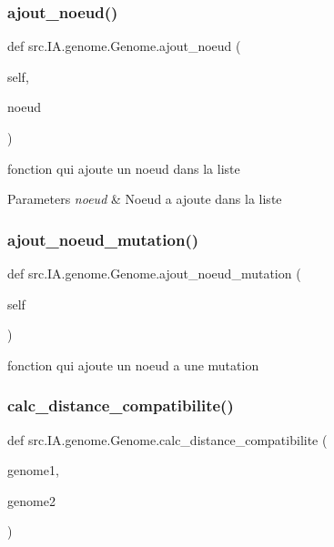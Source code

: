 \subsubsection{\texorpdfstring{ajout\+\_\+noeud()}{ajout\_noeud()}}
{\footnotesize\ttfamily def src.\+I\+A.\+genome.\+Genome.\+ajout\+\_\+noeud (\begin{DoxyParamCaption}\item[{}]{self,  }\item[{}]{noeud }\end{DoxyParamCaption})}



fonction qui ajoute un noeud dans la liste 


\begin{DoxyParams}{Parameters}
{\em noeud} & Noeud a ajoute dans la liste \\
\hline
\end{DoxyParams}
\mbox{\label{classsrc_1_1_i_a_1_1genome_1_1_genome_a48edc3632415eccdb7116dec4d9ba8c0}} 
\subsubsection{\texorpdfstring{ajout\+\_\+noeud\+\_\+mutation()}{ajout\_noeud\_mutation()}}
{\footnotesize\ttfamily def src.\+I\+A.\+genome.\+Genome.\+ajout\+\_\+noeud\+\_\+mutation (\begin{DoxyParamCaption}\item[{}]{self }\end{DoxyParamCaption})}



fonction qui ajoute un noeud a une mutation 

\mbox{\label{classsrc_1_1_i_a_1_1genome_1_1_genome_a03d70c35344336c68ea06ebcea2dd941}} 
\subsubsection{\texorpdfstring{calc\+\_\+distance\+\_\+compatibilite()}{calc\_distance\_compatibilite()}}
{\footnotesize\ttfamily def src.\+I\+A.\+genome.\+Genome.\+calc\+\_\+distance\+\_\+compatibilite (\begin{DoxyParamCaption}\item[{}]{genome1,  }\item[{}]{genome2 }\end{DoxyParamCaption})\hspace{0.3cm}{\ttfamily [static]}}



